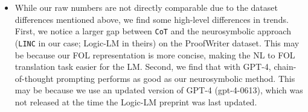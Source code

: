 \begin{itemize}
    \item While our raw numbers are not directly comparable due to the dataset differences mentioned above, we find some high-level differences in trends. First, we notice a larger gap between \texttt{CoT} and the neurosymbolic approach (\texttt{LINC} in our case; Logic-LM in theirs) on the ProofWriter dataset. This may be because our FOL representation is more concise, making the NL to FOL translation task easier for the LM. Second, we find that with GPT-4, chain-of-thought prompting performs as good as our neurosymbolic method. This may be because we use an updated version of GPT-4 (gpt-4-0613), which was not released at the time the Logic-LM preprint was last updated. 
\end{itemize}